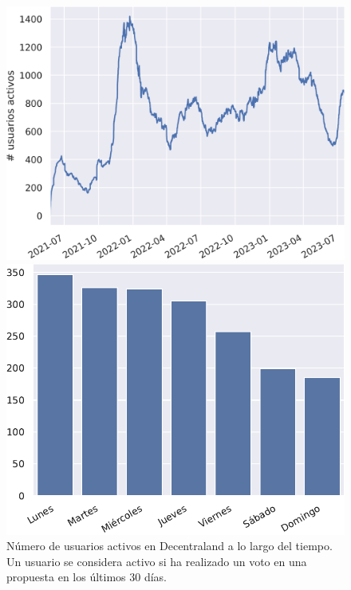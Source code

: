 \begin{figure}[t]
    \begin{minipage}[t]{.48\linewidth}
        \centering
        \includegraphics[width=\linewidth]{figures/04_exploracion/04c_rolling_voters_30D_Decentraland.png}
        \caption[Número de usuarios activos en Decentraland a lo largo del tiempo.]{Número de usuarios activos en Decentraland a lo largo del tiempo. Un usuario se considera activo si ha realizado un voto en una propuesta en los últimos 30 días.}
        \label{fig:datos-activos-tiempo}
    \end{minipage}\hfill%
    \begin{minipage}[t]{.48\linewidth}
        \centering
        \includegraphics[width=\linewidth]{figures/04_exploracion/04_creation_dow_Decentraland.pdf}

\end{minipage}
\end{figure}
